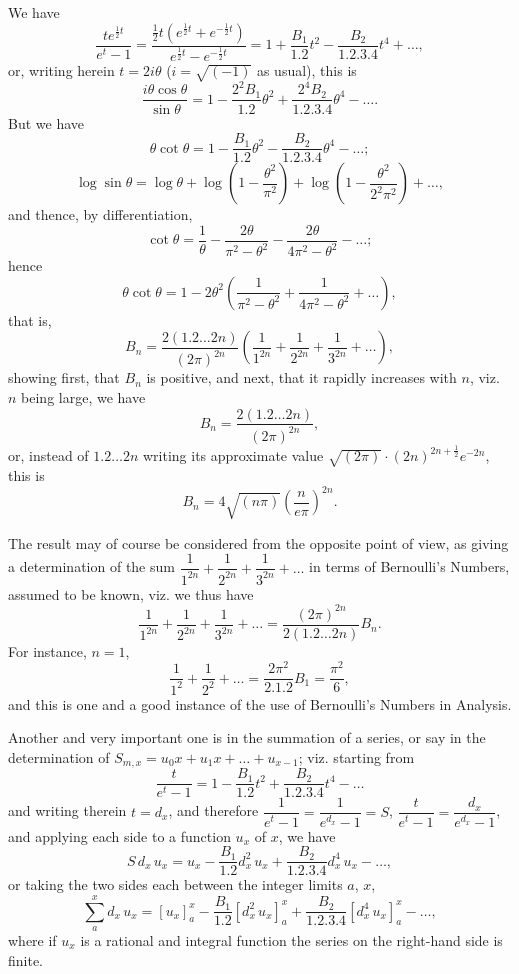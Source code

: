 \documentclass[11pt,a4paper]{article}
\begin{document}
We have
\[
\frac{te^{\frac{1}{2}t}}{e^t-1}
= \frac{\tfrac{1}{2}t(e^{\frac{1}{2}t}+e^{-\frac{1}{2}t})}
         {e^{\frac{1}{2}t}-e^{-\frac{1}{2}t}}
= 1 + \frac{B_1}{1.2}t^2 - \frac{B_2}{1.2.3.4}t^4 + \ldots,
\]
or, writing herein $t=2i\theta$ ($i=\sqrt{(-1)}$ as usual), this is
\[
\frac{i\theta\cos\theta}{\sin\theta}
= 1 - \frac{2^2B_1}{1.2}\theta^2
  + \frac{2^4B_2}{1.2.3.4}\theta^4 - \ldots.
\]
But we have
\[
\theta\cot\theta
= 1 - \frac{B_1}{1.2}\theta^2
  - \frac{B_2}{1.2.3.4}\theta^4 - \ldots;
\]
\[
\log\sin\theta
= \log\theta + \log\left(1-\frac{\theta^2}{\pi^2}\right)
  + \log\left(1-\frac{\theta^2}{2^2\pi^2}\right) + \ldots,
\]
and thence, by differentiation,
\[
\cot\theta
= \frac{1}{\theta}
  - \frac{2\theta}{\pi^2-\theta^2}
  - \frac{2\theta}{4\pi^2-\theta^2} - \ldots;
\]
hence
\[
\theta\cot\theta
= 1 - 2\theta^2\left(\frac{1}{\pi^2-\theta^2}
    + \frac{1}{4\pi^2-\theta^2} + \ldots\right),
\]
that is,
\[
B_n = \frac{2(1.2\ldots 2n)}{(2\pi)^{2n}}
      \left(\frac{1}{1^{2n}} + \frac{1}{2^{2n}} + \frac{1}{3^{2n}} + \ldots\right),
\]
showing first, that $B_n$ is positive, and next, that it rapidly increases
with $n$, viz. $n$ being large, we have
\[
B_n = \frac{2(1.2\ldots 2n)}{(2\pi)^{2n}},
\]
or, instead of $1.2\ldots 2n$ writing its approximate value
$\sqrt{(2\pi)}\cdot(2n)^{2n+\frac{1}{2}}e^{-2n}$, this is
\[
B_n = 4\sqrt{(n\pi)}\left(\frac{n}{e\pi}\right)^{2n}.
\]

\newpage
The result may of course be considered from the opposite point of view, as
giving a determination of the sum
$\dfrac{1}{1^{2n}} + \dfrac{1}{2^{2n}} + \dfrac{1}{3^{2n}} + \ldots$
in terms of Bernoulli's Numbers, assumed to be known, viz. we thus have
\[
\frac{1}{1^{2n}} + \frac{1}{2^{2n}} + \frac{1}{3^{2n}} + \ldots
= \frac{(2\pi)^{2n}}{2(1.2\ldots 2n)}B_n.
\]
For instance, $n=1$,
\[
\frac{1}{1^2} + \frac{1}{2^2} + \ldots
= \frac{2\pi^2}{2.1.2}B_1 = \frac{\pi^2}{6},
\]
and this is one and a good instance of the use of Bernoulli's Numbers in
Analysis.

Another and very important one is in the summation of a series, or say in
the determination of $S_{m,x} = u_0x + u_1x + \ldots + u_{x-1}$; viz.
starting from
\[
\frac{t}{e^t-1}
= 1 - \frac{B_1}{1.2}t^2 + \frac{B_2}{1.2.3.4}t^4 - \ldots
\]
and writing therein $t=d_x$, and therefore $\dfrac{1}{e^t-1}=\dfrac{1}{e^{d_x}-1}=S$,
$\dfrac{t}{e^t-1}=\dfrac{d_x}{e^{d_x}-1}$, and applying each side to a function
$u_x$ of $x$, we have
\[
S\,d_x\,u_x = u_x - \frac{B_1}{1.2}d_x^2\,u_x
  + \frac{B_2}{1.2.3.4}d_x^4\,u_x - \ldots,
\]
or taking the two sides each between the integer limits $a$, $x$,
\[
\sum_a^x d_x\,u_x = [u_x]_a^x - \frac{B_1}{1.2}[d_x^2\,u_x]_a^x
  + \frac{B_2}{1.2.3.4}[d_x^4\,u_x]_a^x - \ldots,
\]
where if $u_x$ is a rational and integral function the series on the
right-hand side is finite.
\end{document}
